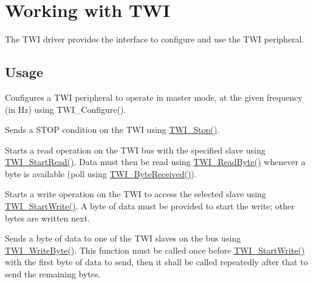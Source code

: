 \hypertarget{group__twi__module}{}\section{Working with T\+WI}
\label{group__twi__module}
The T\+WI driver provides the interface to configure and use the T\+WI peripheral.\hypertarget{group__RTEMSBSPsARM_Usage}{}\subsection{Usage}\label{group__RTEMSBSPsARM_Usage}

\begin{DoxyItemize}
\item Configures a T\+WI peripheral to operate in master mode, at the given frequency (in Hz) using T\+W\+I\+\_\+\+Configure().  
\item Sends a S\+T\+OP condition on the T\+WI using \mbox{\hyperlink{arm_2atsam_2contrib_2libraries_2libchip_2source_2twi_8c_ab6f6a89c7dbb1075f904386273252977}{T\+W\+I\+\_\+\+Stop()}}. 
\item Starts a read operation on the T\+WI bus with the specified slave using \mbox{\hyperlink{arm_2atsam_2contrib_2libraries_2libchip_2source_2twi_8c_a806d1ace472ce5f4e2fe2de6f5a425ff}{T\+W\+I\+\_\+\+Start\+Read()}}. Data must then be read using \mbox{\hyperlink{arm_2atsam_2contrib_2libraries_2libchip_2source_2twi_8c_a8b4e96e6ce1126921517147b048fde51}{T\+W\+I\+\_\+\+Read\+Byte()}} whenever a byte is available (poll using \mbox{\hyperlink{arm_2atsam_2contrib_2libraries_2libchip_2source_2twi_8c_a2bb399b4984df2fdaabf741326636de2}{T\+W\+I\+\_\+\+Byte\+Received()}}). 
\item Starts a write operation on the T\+WI to access the selected slave using \mbox{\hyperlink{arm_2atsam_2contrib_2libraries_2libchip_2source_2twi_8c_a933fafb0a0d430f7feb10d01138b0466}{T\+W\+I\+\_\+\+Start\+Write()}}. A byte of data must be provided to start the write; other bytes are written next. 
\item Sends a byte of data to one of the T\+WI slaves on the bus using \mbox{\hyperlink{arm_2atsam_2contrib_2libraries_2libchip_2source_2twi_8c_ad728b448499f0b4d4633dfe0cc4a5ee7}{T\+W\+I\+\_\+\+Write\+Byte()}}. This function must be called once before \mbox{\hyperlink{arm_2atsam_2contrib_2libraries_2libchip_2source_2twi_8c_a933fafb0a0d430f7feb10d01138b0466}{T\+W\+I\+\_\+\+Start\+Write()}} with the first byte of data to send, then it shall be called repeatedly after that to send the remaining bytes. 

\end{DoxyItemize}
